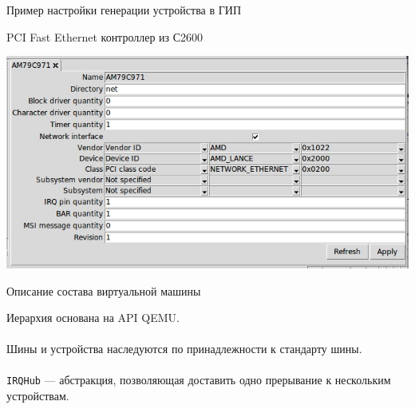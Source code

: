 \documentclass[unicode,hyperref={unicode=true}]{beamer}
\theoremstyle{definition}
\theoremstyle{plain}
\begin{document}
\begin{frame}{Пример настройки генерации устройства в ГИП}
\begin{center}
PCI Fast Ethernet контроллер из С2600
\end{center}
\includegraphics[width=\linewidth]{AM79C971.jpg}
\end{frame}



\begin{frame}[fragile]{Описание состава виртуальной машины}

\begin{minipage}{0.61\textwidth}
\end{minipage}
\begin{minipage}{0.37\textwidth}
Иерархия основана на API QEMU.\\
 \\
Шины и устройства наследуются по принадлежности к стандарту шины.\\
 \\
\texttt{IRQHub} --- абстракция, позволяющая доставить одно прерывание к
нескольким устройствам.
\end{minipage}
\end{frame}
\end{document}
